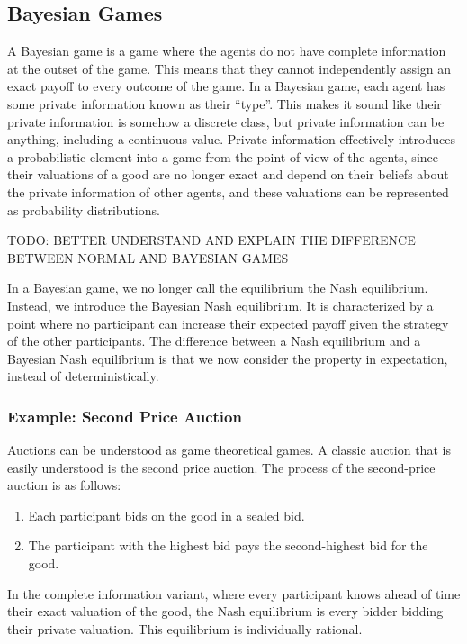 \subsection{Bayesian Games}
A Bayesian game is a game where the agents do not have complete information at
the outset of the game. This means that they cannot independently assign an
exact payoff to every outcome of the game. In a Bayesian game, each agent has
some private information known as their “type”. This makes it sound like their
private information is somehow a discrete class, but private information can be
anything, including a continuous value. Private information effectively
introduces a probabilistic element into a game from the point of view of the
agents, since their valuations of a good are no longer exact and depend on
their beliefs about the private information of other agents, and these
valuations can be represented as probability distributions.

TODO: BETTER UNDERSTAND AND EXPLAIN THE DIFFERENCE BETWEEN NORMAL AND BAYESIAN GAMES

In a Bayesian game, we no longer call the equilibrium the Nash equilibrium.
Instead, we introduce the Bayesian Nash equilibrium. It is characterized by a
point where no participant can increase their expected payoff given the
strategy of the other participants. The difference between a Nash equilibrium
and a Bayesian Nash equilibrium is that we now consider the property in
expectation, instead of deterministically.

\subsubsection{Example: Second Price Auction}

Auctions can be understood as game theoretical games. A classic auction that is
easily understood is the second price auction. The process of the second-price
auction is as follows:

\begin{enumerate}
  \item Each participant bids on the good in a sealed bid.
  \item The participant with the highest bid pays the second-highest bid for
    the good.
\end{enumerate}

In the complete information variant, where every participant knows ahead
of time their exact valuation of the good, the Nash equilibrium is every bidder
bidding their private valuation. This equilibrium is individually rational.

